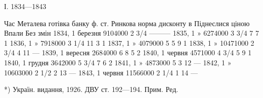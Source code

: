 І. 1834—1843

Час        Металева готівка банку ф. ст. Ринкова  норма  дисконту  в%
Піднеслися ціною      Впали     Без змін
1834, 1    березня   9104000    2 3/4 ———
1835, 1    »    6274000    3 3/4    7    7    1
1836, 1    »    7918000    3 1/4    11    3    1
1837, 1    »  4079000    5    5    9    1
1838, 1    »   10471000    2 3/4    4    11 —
1839, 1    вересня   2684000    6    8    5    2
1840, 1    червня  4571000    4 3/4    5    9    1
1840, 1    грудня 3642000    5 3/4    7    6    2
1841, 1    »    4873000    5    3    12 —
1842, 1    »    10603000    2 1/2    2    13 —
1843, 1    червня  11566000    2 1/4    1    14 —

*) Україн. видання, 1926. ДВУ ст. 192—194. Прим. Ред.
